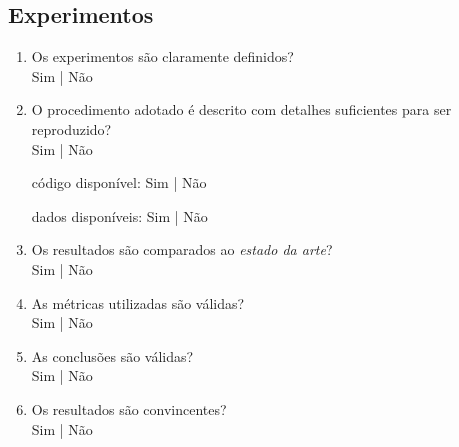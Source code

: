 \documentclass{UnBExam}%
\begin{document}
	\subsection{Experimentos}%
	\begin{enumerate}
		\item Os experimentos são claramente definidos?\\%
		Sim | Não

		\item O procedimento adotado é descrito com detalhes suficientes para
		ser reproduzido?\\%
		Sim | Não%
		\hfill\begin{minipage}{.29\textwidth}%

		\hfill código disponível: Sim | Não%

		\hfill dados disponíveis: Sim | Não%
		\end{minipage}%

		\item Os resultados são comparados ao \emph{estado da arte}?\\%
		Sim | Não

		\item As métricas utilizadas são válidas?\\%
		Sim | Não

		\item As conclusões são válidas?\\%
		Sim | Não

		\item Os resultados são convincentes?\\%
		Sim | Não
	\end{enumerate}%
\end{document}
